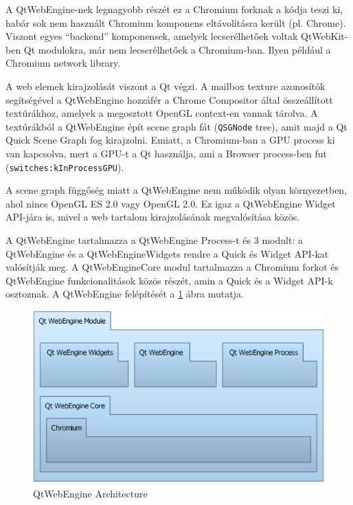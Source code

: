 \documentclass[12pt]{report}
\begin{document}
A QtWebEngine-nek legnagyobb részét ez a Chromium forknak a kódja teszi ki, habár sok
nem használt Chromium komponens eltávolításra került (pl. Chrome). Viszont egyes
``backend'' komponensek, amelyek lecserélhetőek voltak QtWebKit-ben Qt modulokra, már
nem lecserélhetőek a Chromium-ban. Ilyen például a Chromium network library.

A web elemek kirajzolását viszont a Qt végzi. A mailbox texture azonosítók segítségével a
QtWebEngine hozzáfér a Chrome Compositor által összeállított textúrákhoz, amelyek a
megosztott OpenGL context-en vannak tárolva.
A textúrákból a QtWebEngine épít scene graph fát (\texttt{QSGNode} tree), amit majd a
Qt Quick Scene Graph fog kirajzolni. Emiatt, a Chromium-ban a GPU process ki van kapcsolva,
mert a GPU-t a Qt használja, ami a Browser process-ben fut (\texttt{switches:kInProcessGPU}).

A scene graph függőség miatt a QtWebEngine nem működik olyan környezetben, ahol nincs
OpenGL ES 2.0 vagy OpenGL 2.0. Ez igaz a QtWebEngine Widget API-jára is, mivel a web tartalom
kirajzolásának megvalósítása közös.

A QtWebEngine tartalmazza a QtWebEngine Process-t és 3 modult: a QtWebEngine és a
QtWebEngineWidgets rendre a Quick és Widget API-kat valósítják meg. A QtWebEngineCore
modul tartalmazza a Chromium forkot és QtWebEngine funkcionalitások közös részét, amin a
Quick és a Widget API-k osztoznak. A QtWebEngine felépítését a
\ref{fig:qtwebengine-architecture} ábra mutatja.

\begin{figure}[ht]
    \centering
    \includegraphics[scale=0.75]{qtwebengine-architecture}
    \caption{
        \label{fig:qtwebengine-architecture}
        QtWebEngine Architecture \cite{bib:qt-doc-webengine-overview}
    }
\end{figure}
\end{document}
